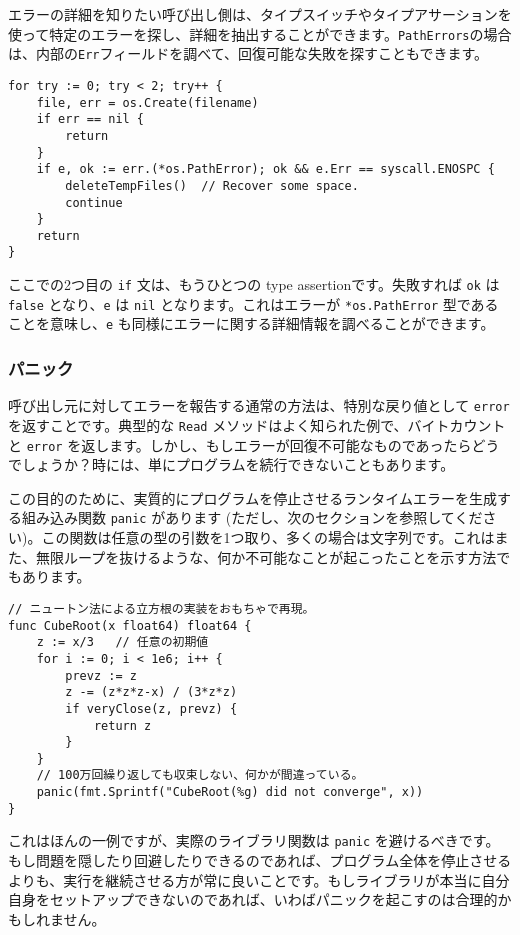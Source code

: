 \documentclass{jsarticle}
\begin{document}
エラーの詳細を知りたい呼び出し側は、タイプスイッチやタイプアサーションを使って特定のエラーを探し、詳細を抽出することができます。\texttt{PathErrors}の場合は、内部の\texttt{Err}フィールドを調べて、回復可能な失敗を探すこともできます。

\begin{lstlisting}[numbers=none]
for try := 0; try < 2; try++ {
    file, err = os.Create(filename)
    if err == nil {
        return
    }
    if e, ok := err.(*os.PathError); ok && e.Err == syscall.ENOSPC {
        deleteTempFiles()  // Recover some space.
        continue
    }
    return
}
\end{lstlisting}

ここでの2つ目の \texttt{if} 文は、もうひとつの
{type assertion}です。失敗すれば \texttt{ok} は \texttt{false}
となり、\texttt{e} は \texttt{nil} となります。これはエラーが
\texttt{*os.PathError} 型であることを意味し、\texttt{e}
も同様にエラーに関する詳細情報を調べることができます。

\subsubsection{パニック}

呼び出し元に対してエラーを報告する通常の方法は、特別な戻り値として
\texttt{error} を返すことです。典型的な \texttt{Read}
メソッドはよく知られた例で、バイトカウントと \texttt{error}
を返します。しかし、もしエラーが回復不可能なものであったらどうでしょうか？時には、単にプログラムを続行できないこともあります。

この目的のために、実質的にプログラムを停止させるランタイムエラーを生成する組み込み関数
\texttt{panic} があります
(ただし、次のセクションを参照してください)。この関数は任意の型の引数を1つ取り、多くの場合は文字列です。これはまた、無限ループを抜けるような、何か不可能なことが起こったことを示す方法でもあります。

\begin{lstlisting}[numbers=none]
// ニュートン法による立方根の実装をおもちゃで再現。
func CubeRoot(x float64) float64 {
    z := x/3   // 任意の初期値
    for i := 0; i < 1e6; i++ {
        prevz := z
        z -= (z*z*z-x) / (3*z*z)
        if veryClose(z, prevz) {
            return z
        }
    }
    // 100万回繰り返しても収束しない、何かが間違っている。
    panic(fmt.Sprintf("CubeRoot(%g) did not converge", x))
}
\end{lstlisting}

これはほんの一例ですが、実際のライブラリ関数は \texttt{panic}
を避けるべきです。もし問題を隠したり回避したりできるのであれば、プログラム全体を停止させるよりも、実行を継続させる方が常に良いことです。もしライブラリが本当に自分自身をセットアップできないのであれば、いわばパニックを起こすのは合理的かもしれません。
\end{document}
